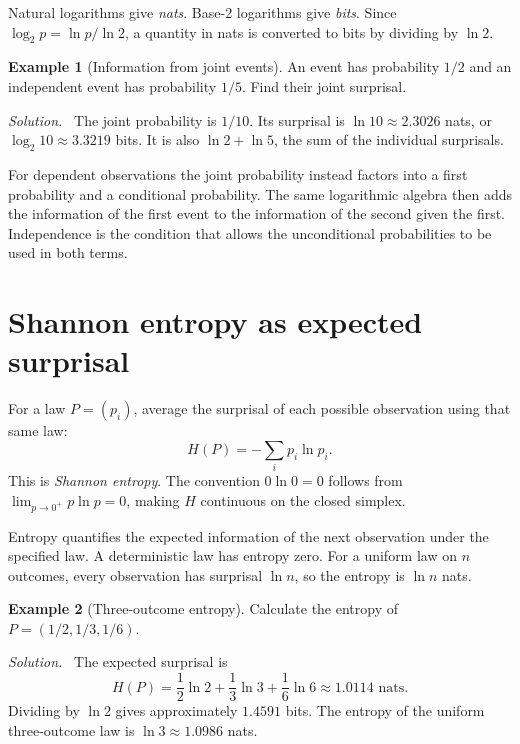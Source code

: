 \documentclass[11pt,oneside,openany]{book}
\theoremstyle{definition}
\newtheorem{example}{Example}[chapter]
\theoremstyle{remark}
\newenvironment{solution}{\par\smallskip\noindent\textit{Solution.}\ }{\par\smallskip}
\numberwithin{equation}{chapter}
\begin{document}
Natural logarithms give \emph{nats}. Base-2 logarithms give \emph{bits}. Since $\log_2p=\ln p/\ln2$, a quantity in nats is converted to bits by dividing by $\ln2$.

\begin{example}[Information from joint events]
An event has probability $1/2$ and an independent event has probability $1/5$. Find their joint surprisal.
\begin{solution}
The joint probability is $1/10$. Its surprisal is $\ln10\approx2.3026$ nats, or $\log_2 10\approx3.3219$ bits. It is also $\ln2+\ln5$, the sum of the individual surprisals.
\end{solution}
\end{example}

For dependent observations the joint probability instead factors into a first probability and a conditional probability. The same logarithmic algebra then adds the information of the first event to the information of the second given the first. Independence is the condition that allows the unconditional probabilities to be used in both terms.

\section{Shannon entropy as expected surprisal}
For a law $P=(p_i)$, average the surprisal of each possible observation using that same law:
\begin{equation}\label{eq:entropy}
\boxed{H(P)=-\sum_i p_i\ln p_i.}
\end{equation}
This is \emph{Shannon entropy}. The convention $0\ln0=0$ follows from $\lim_{p\to0^+}p\ln p=0$, making $H$ continuous on the closed simplex.

Entropy quantifies the expected information of the next observation under the specified law. A deterministic law has entropy zero. For a uniform law on $n$ outcomes, every observation has surprisal $\ln n$, so the entropy is $\ln n$ nats.

\begin{example}[Three-outcome entropy]
Calculate the entropy of $P=(1/2,1/3,1/6)$.
\begin{solution}
The expected surprisal is
\[
H(P)=\frac12\ln2+\frac13\ln3+\frac16\ln6
\approx1.0114\text{ nats}.
\]
Dividing by $\ln2$ gives approximately $1.4591$ bits. The entropy of the uniform three-outcome law is $\ln3\approx1.0986$ nats.
\end{solution}
\end{example}
\end{document}
